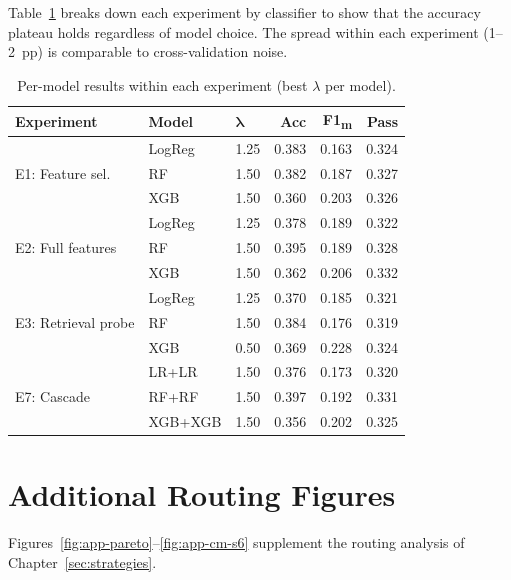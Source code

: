 Table~\ref{tab:app-routing-models} breaks down each experiment by
classifier to show that the accuracy plateau holds regardless of model
choice.  The spread within each experiment (1--2~pp) is comparable to
cross-validation noise.

\begin{table}[H]
\centering
\small
\begin{tabular}{l l l r r r}
\hline
\textbf{Experiment} & \textbf{Model} & $\bm{\lambda}$ & \textbf{Acc} & \textbf{F1\textsubscript{m}} & \textbf{Pass} \\
\hline
\multirow{3}{*}{E1: Feature sel.}
  & LogReg & 1.25 & 0.383 & 0.163 & 0.324 \\
  & RF     & 1.50 & 0.382 & 0.187 & 0.327 \\
  & XGB    & 1.50 & 0.360 & 0.203 & 0.326 \\
\hline
\multirow{3}{*}{E2: Full features}
  & LogReg & 1.25 & 0.378 & 0.189 & 0.322 \\
  & RF     & 1.50 & 0.395 & 0.189 & 0.328 \\
  & XGB    & 1.50 & 0.362 & 0.206 & 0.332 \\
\hline
\multirow{3}{*}{E3: Retrieval probe}
  & LogReg & 1.25 & 0.370 & 0.185 & 0.321 \\
  & RF     & 1.50 & 0.384 & 0.176 & 0.319 \\
  & XGB    & 0.50 & 0.369 & 0.228 & 0.324 \\
\hline
\multirow{3}{*}{E7: Cascade}
  & LR+LR  & 1.50 & 0.376 & 0.173 & 0.320 \\
  & RF+RF  & 1.50 & 0.397 & 0.192 & 0.331 \\
  & XGB+XGB & 1.50 & 0.356 & 0.202 & 0.325 \\
\hline
\end{tabular}
\caption{Per-model results within each experiment (best $\lambda$ per model).}
\label{tab:app-routing-models}
\end{table}



\section{Additional Routing Figures}
\label{app:routing-figures}

Figures~\ref{fig:app-pareto}--\ref{fig:app-cm-s6} supplement
the routing analysis of Chapter~\ref{sec:strategies}.

